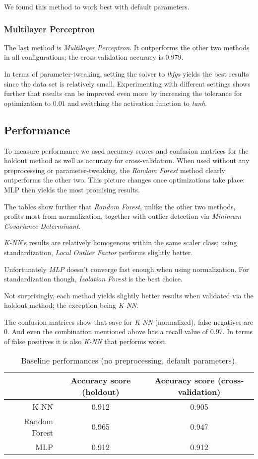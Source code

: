 \documentclass{article}
\begin{document}
We found this method to work best with default parameters.

\subsubsection*{Multilayer Perceptron}
The last method is \textit{Multilayer Perceptron}.
It outperforms the other two methods in all configurations; the cross-validation accuracy is $0.979$.

In terms of parameter-tweaking, setting the solver to \textit{lbfgs} yields the best results since the data set is relatively small.
Experimenting with different settings shows further that results can be improved even more by increasing the tolerance for optimization to $0.01$ and switching the activation function to \textit{tanh}.

\subsection*{Performance}
To measure performance we used accuracy scores and confusion matrices for the holdout method as well as accuracy for cross-validation.
When used without any preprocessing or parameter-tweaking, the \textit{Random Forest} method clearly outperforms the other two.
This picture changes once optimizations take place: MLP then yields the most promising results.

The tables show further that \textit{Random Forest}, unlike the other two methods, profits most from normalization, together with outlier detection via \textit{Minimum Covariance Determinant}.

\textit{K-NN}'s results are relatively homogenous within the same scaler class;
using standardization, \textit{Local Outlier Factor} performs slightly better.

Unfortunately \textit{MLP} doesn't converge fast enough when using normalization.
For standardization though, \textit{Isolation Forest} is the best choice.

Not surprisingly, each method yields slightly better results when validated via the holdout method;
the exception being \textit{K-NN}.

The confusion matrices show that save for \textit{K-NN} (normalized), false negatives are $0$.
And even the combination mentioned above has a recall value of $0.97$.
In terms of false positives it is also \textit{K-NN} that performs worst.

\begin{table}[h]
\begin{center}
\begin{tabular}{r|c|c}
& Accuracy score (holdout) & Accuracy score (cross-validation) \\
\hline
K-NN & 0.912 & 0.905 \\
Random Forest & 0.965 & 0.947 \\
MLP & 0.912 & 0.912 \\
\end{tabular}
\caption{Baseline performances (no preprocessing, default parameters).}
\end{center}
\end{table}
\end{document}
